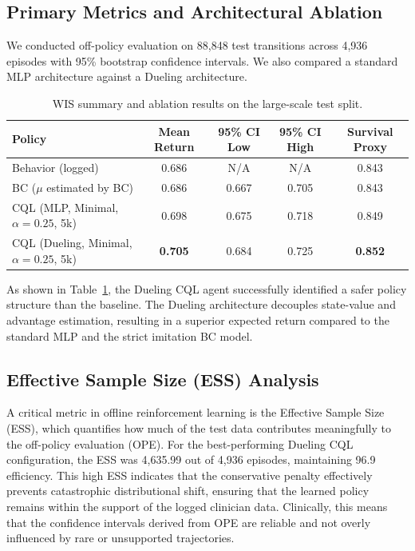 \documentclass[11pt]{article}
\begin{document}
\subsection{Primary Metrics and Architectural Ablation}
We conducted off-policy evaluation on 88,848 test transitions across 4,936 episodes with 95\% bootstrap confidence intervals. We also compared a standard MLP architecture against a Dueling architecture.

\begin{table}[h]
\centering
\begin{tabular}{lcccc}
\toprule
Policy & Mean Return & 95\% CI Low & 95\% CI High & Survival Proxy \\
\midrule
Behavior (logged) & 0.686 & N/A & N/A & 0.843 \\
BC ($\mu$ estimated by BC) & 0.686 & 0.667 & 0.705 & 0.843 \\
CQL (MLP, Minimal, $\alpha=0.25$, 5k) & 0.698 & 0.675 & 0.718 & 0.849 \\
CQL (Dueling, Minimal, $\alpha=0.25$, 5k) & \textbf{0.705} & 0.684 & 0.725 & \textbf{0.852} \\
\bottomrule
\end{tabular}
\caption{WIS summary and ablation results on the large-scale test split.}
\label{tab:wis_demo}
\end{table}

As shown in Table~\ref{tab:wis_demo}, the Dueling CQL agent successfully identified a safer policy structure than the baseline. The Dueling architecture decouples state-value and advantage estimation, resulting in a superior expected return compared to the standard MLP and the strict imitation BC model.

\subsection{Effective Sample Size (ESS) Analysis}
A critical metric in offline reinforcement learning is the Effective Sample Size (ESS), which quantifies how much of the test data contributes meaningfully to the off-policy evaluation (OPE). For the best-performing Dueling CQL configuration, the ESS was 4,635.99 out of 4,936 episodes, maintaining 96.9
efficiency. This high ESS indicates that the conservative penalty effectively prevents catastrophic distributional shift, ensuring that the learned policy remains within the support of the logged clinician data. Clinically, this means that the confidence intervals derived from OPE are reliable and not overly influenced by rare or unsupported trajectories.
\end{document}

